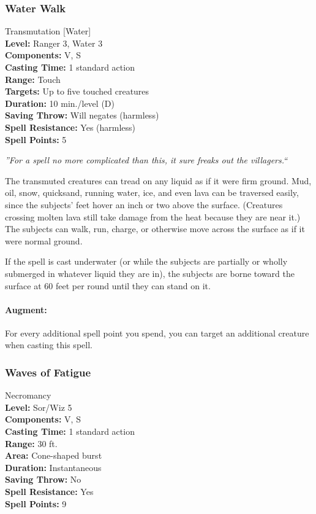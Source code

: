 \subsubsection{Water Walk}
\label{Spell:WaterWalk}
Transmutation [Water]
\\ \textbf{Level:} Ranger 3, Water 3
\\ \textbf{Components:} V, S
\\ \textbf{Casting Time:} 1 standard action
\\ \textbf{Range:} Touch
\\ \textbf{Targets:} Up to five touched creatures
\\ \textbf{Duration:} 10 min./level (D)
\\ \textbf{Saving Throw:} Will negates (harmless)
\\ \textbf{Spell Resistance:} Yes (harmless)
\\ \textbf{Spell Points:} 5

\emph{''For a spell no more complicated than this, it sure freaks out the villagers.``}

The transmuted creatures can tread on any liquid as if it were firm ground. 
Mud, oil, snow, quicksand, running water, ice, and even lava can be traversed easily, since the subjects' feet hover an inch or two above the surface. 
(Creatures crossing molten lava still take damage from the heat because they are near it.) 
The subjects can walk, run, charge, or otherwise move across the surface as if it were normal ground.

If the spell is cast underwater (or while the subjects are partially or wholly submerged in whatever liquid they are in), the subjects are borne toward the surface at 60 feet per round until they can stand on it.

\paragraph{Augment:} For every additional spell point you spend, you can target an additional creature when casting this spell.
\subsubsection{Waves of Fatigue}
\label{Spell:WavesOfFatigue}
Necromancy
\\ \textbf{Level:} Sor/Wiz 5
\\ \textbf{Components:} V, S
\\ \textbf{Casting Time:} 1 standard action
\\ \textbf{Range:} 30 ft.
\\ \textbf{Area:} Cone-shaped burst
\\ \textbf{Duration:} Instantaneous
\\ \textbf{Saving Throw:} No
\\ \textbf{Spell Resistance:} Yes
\\ \textbf{Spell Points:} 9

